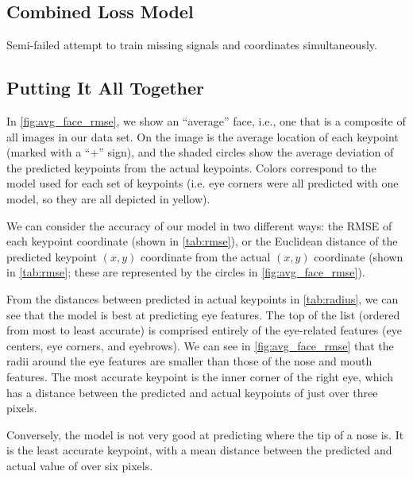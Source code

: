 \documentclass[journal]{IEEEtran}
\begin{document}


\subsection{Combined Loss Model}
Semi-failed attempt to train missing signals and coordinates simultaneously.

\subsection{Putting It All Together}

In \cref{fig:avg_face_rmse}, we show an ``average'' face, i.e., one that is a composite of all images in our data set. On the image is the average location of each keypoint (marked with a ``+'' sign), and the shaded circles show the average deviation of the predicted keypoints from the actual keypoints. Colors correspond to the model used for each set of keypoints (i.e. eye corners were all predicted with one model, so they are all depicted in yellow).

We can consider the accuracy of our model in two different ways: the RMSE of each keypoint coordinate (shown in \cref{tab:rmse}), or the Euclidean distance of the predicted keypoint $(x,y)$ coordinate from the actual $(x,y)$ coordinate (shown in \cref{tab:rmse}; these are represented by the circles in \cref{fig:avg_face_rmse}). 

From the distances between predicted in actual keypoints in \cref{tab:radius}, we can see that the model is best at predicting eye features. The top of the list (ordered from most to least accurate) is comprised entirely of the eye-related features (eye centers, eye corners, and eyebrows). We can see in \cref{fig:avg_face_rmse} that the radii around the eye features are smaller than those of the nose and mouth features. The most accurate keypoint is the inner corner of the right eye, which has a distance between the predicted and actual keypoints of just over three pixels.

Conversely, the model is not very good at predicting where the tip of a nose is. It is the least accurate keypoint, with a mean distance between the predicted and actual value of over six pixels.
\end{document}
